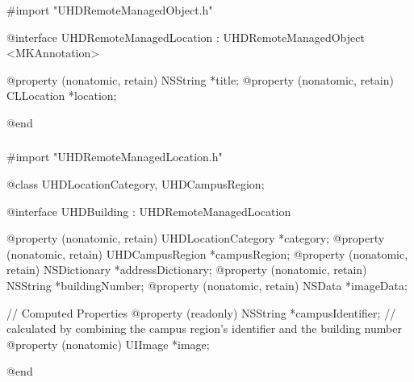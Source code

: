 \documentclass{report}
\begin{document}
\vspace{0,5cm}

\subsubsection{}

\begin{objclst}
#import "UHDRemoteManagedObject.h"


@interface UHDRemoteManagedLocation : UHDRemoteManagedObject <MKAnnotation>

@property (nonatomic, retain) NSString *title;
@property (nonatomic, retain) CLLocation *location;

@end
\end{objclst}

\vspace{0,5cm}

\subsubsection{}

\begin{objclst}
#import "UHDRemoteManagedLocation.h"

@class UHDLocationCategory, UHDCampusRegion;

@interface UHDBuilding : UHDRemoteManagedLocation

@property (nonatomic, retain) UHDLocationCategory *category;
@property (nonatomic, retain) UHDCampusRegion *campusRegion;
@property (nonatomic, retain) NSDictionary *addressDictionary;
@property (nonatomic, retain) NSString *buildingNumber;
@property (nonatomic, retain) NSData *imageData;

// Computed Properties
@property (readonly) NSString *campusIdentifier; // calculated by combining the campus region's identifier and the building number
@property (nonatomic) UIImage *image;

@end
\end{objclst}

\vspace{0,5cm}

\subsubsection{}
\end{document}
